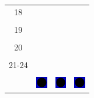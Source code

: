 \documentclass[a4paper,12pt, tikz]{scrartcl}
\begin{document}
\begin{tabularx}{\linewidth}{|c|X|X|X|}
      \hline
      18&   &       &    \\
        &   &       &    \\
      \hline
      19&   &       &    \\
        &   &       &    \\
      \hline
      20&   &       &    \\
        &   &       &    \\
      \hline
      21-24&   &       &    \\
        &   &       &    \\
      \hline  
      & \vspace{0.01cm} \centerline{\includegraphics[width=0.5cm]{moon_phases/Moon_phase_0.svg.png}} \vspace{0.1cm} & \vspace{0.01cm} \centerline{\includegraphics[width=0.5cm]{moon_phases/Moon_phase_0.svg.png}} \vspace{0.1cm} & \vspace{0.01cm} \centerline{\includegraphics[width=0.5cm]{moon_phases/Moon_phase_0.svg.png}} \vspace{0.1cm}\\
      \hline   
    \end{tabularx}




    \newpage

        \noindent
\end{document}
